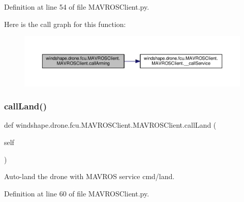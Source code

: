 Definition at line 54 of file M\+A\+V\+R\+O\+S\+Client.\+py.

Here is the call graph for this function\+:\nopagebreak
\begin{figure}[H]
\begin{center}
\leavevmode
\includegraphics[width=350pt]{classwindshape_1_1drone_1_1fcu_1_1_m_a_v_r_o_s_client_1_1_m_a_v_r_o_s_client_a7ccde40ffe0ec0eb71d096c8b2a75dbd_cgraph}
\end{center}
\end{figure}
\mbox{\label{classwindshape_1_1drone_1_1fcu_1_1_m_a_v_r_o_s_client_1_1_m_a_v_r_o_s_client_ac77f4239dbb70c88ed3bf45967b35fc0}} 
\subsubsection{\texorpdfstring{call\+Land()}{callLand()}}
{\footnotesize\ttfamily def windshape.\+drone.\+fcu.\+M\+A\+V\+R\+O\+S\+Client.\+M\+A\+V\+R\+O\+S\+Client.\+call\+Land (\begin{DoxyParamCaption}\item[{}]{self }\end{DoxyParamCaption})}

\begin{DoxyVerb}Auto-land the drone with MAVROS service cmd/land.\end{DoxyVerb}
 

Definition at line 60 of file M\+A\+V\+R\+O\+S\+Client.\+py.

